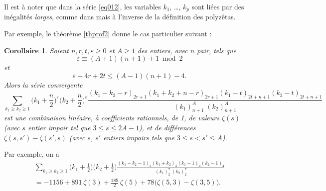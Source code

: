 \documentclass[12pt,francais, reqno]{smfart}
\numberwithin{equation}{section}
\newcommand{\eps}{\varepsilon}
\newtheorem{Cor}{Corollaire}
\begin{document}
\bigskip

Il est \`a noter que dans la s\'erie \eqref{eq012}, les variables $k_1$, \ldots, $k_p$ 
sont li\'ees par des in\'egalit\'es {\em larges}, comme dans \cite{CFRalgo} mais \`a l'inverse de la d\'efinition des polyz\^etas. 

\bigskip



Par exemple, le th\'eor\`eme \ref{thprof2} donne le cas particulier suivant : 

\begin{Cor} \label{corprofdeux}
Soient $n, r, t, \eps  \geq 0$ et $A \geq 1$ des entiers, avec $n$ pair,  tels que
$$\eps  \equiv (A+1)(n+1) +1  \bmod 2$$ 
et
$$\eps + 4 r + 2 t \leq (A-1)(n+1)-4.$$
Alors la s\'erie convergente
$$
\sum_{k_1 \geq k_2 \geq 1}
  \big(k_1 + \frac{n}{2}\big)^{\eps }  \big(k_2 + \frac{n}{2}\big)^{\eps } 
 \frac{ (k_1-k_2-r)_{2r+1} (k_1+k_2+n-r)_{2r+1} (k_1-t)_{2t+n+1}  
 (k_2-t)_{2t+n+1} }{(k_1)_{n+1}^{A}  \;(k_2)_{n+1}^{A} }
$$
est une combinaison lin\'eaire, \`a coefficients rationnels, de 1,   
de valeurs $\zeta(s)$ (avec $s$ entier impair tel que  $3 \leq s \leq  2A-1$), 
et  de diff\'erences $\zeta(s,s') - \zeta(s',s)$ (avec $s$, $s'$ entiers impairs tels que $3 \leq s < s' \leq A$).
\end{Cor}

Par exemple, on a 
\begin{multline*}
\sum_{k_1\ge k_2\ge 1} \big(k_1+\frac 12\big)\big(k_2+\frac 12\big)\frac{(k_1-k_2-1)_3(k_1+k_2)_3(k_1-1)_4(k_2-1)_4}
{(k_1)_2^7\;(k_2)_2^7} 
\\
= -1156 +891\,\zeta(3)+ \frac{189}2 \,\zeta(5) + 78 \big(\zeta(5,3) -\zeta(3,5)\big).
\end{multline*}


\bigskip
\end{document}
